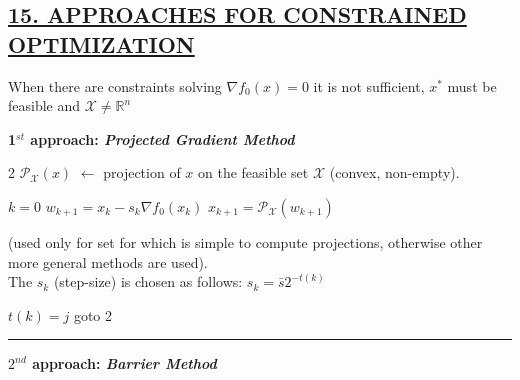 \documentclass[a4paper]{article}
\begin{document}
\subsection*{\color{cyan}
\textsf{
    \underline{15. APPROACHES FOR CONSTRAINED OPTIMIZATION}}}
\begin{center}
    \textsf{When there are constraints solving $\nabla{f_0(x)}=0$ it is not sufficient, $x^*$ must be feasible and $\mathcal{X}\ne\mathbb{R}^n$}
\end{center}
\vspace{-0.2cm}
\textbf{1$^{st}$ approach: \textit{Projected Gradient Method}}
\vspace{-0.3cm}
\begin{multicols}{2}
    \noindent
    $\mathcal{P}_\mathcal{X}(x)$ $\leftarrow$ projection of $x$ on the feasible set $\mathcal{X}$ (convex, non-empty). 
    \vspace{-0.3cm}
    \begin{algorithm}[H]
        \caption{Projected Gradient Method}
        \begin{algorithmic}[1]
            \State $k=0$
            \State $w_{k+1}=x_{k}-s_k\nabla{f_0(x_k)}$  
            \State $x_{k+1}=\mathcal{P}_\mathcal{X}(w_{k+1})$ 
        \end{algorithmic}
    \end{algorithm}
    \vspace{-0.5cm}
    \noindent
    (used only for set for which is simple to compute projections, otherwise other more general methods are used).
    \newcolumn\\
    The $s_k$ (step-size) is chosen as follows: $s_k=\bar{s}2^{-t(k)}$
    \vspace{-0.3cm}
    \begin{algorithm}[H]
        \caption{Stepsize selection}
        \begin{algorithmic}[1]
                \State $t(k)=j$
            \Else
                \State goto 2
            \EndIf
        \end{algorithmic}
    \end{algorithm}
    \noindent
\end{multicols}
\vspace{-0.2cm}
\noindent
\rule{\textwidth}{1.3pt}
\noindent
\textbf{$2^{nd}$ approach: \textit{Barrier Method}}
\end{document}
